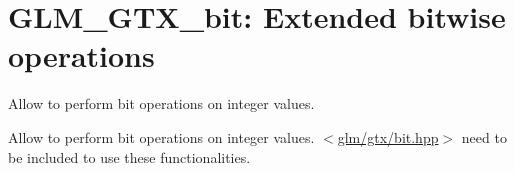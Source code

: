 \hypertarget{group__gtx__bit}{\section{\-G\-L\-M\-\_\-\-G\-T\-X\-\_\-bit\-: \-Extended bitwise operations}
\label{group__gtx__bit}
}


\-Allow to perform bit operations on integer values.  


\-Allow to perform bit operations on integer values. $<$\hyperlink{bit_8hpp}{glm/gtx/bit.\-hpp}$>$ need to be included to use these functionalities. 